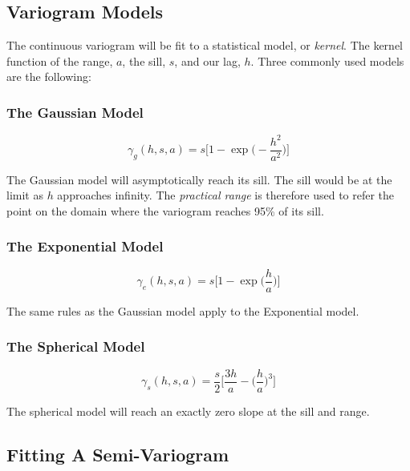 \documentclass[11pt]{ucthesis}
\begin{document}
\subsection{Variogram Models}
The continuous variogram will be fit to a statistical model, or \textit{kernel}. The kernel function of the range, $a$, the sill, $s$, and our lag, $h$. Three commonly used models are the following: %
\subsubsection{The Gaussian Model}

\begin{equation}
	\gamma_g(h, s, a) = s \Bigg[ 1 - \exp \Bigg( -\dfrac{h^2}{a^2} \Bigg) \Bigg]
	\label{eq:gauss_model}
\end{equation}

The Gaussian model will asymptotically reach its sill. The sill would be at the limit as $h$ approaches infinity. The \textit{practical range} is therefore used to refer the point on the domain where the variogram reaches 95\% of its sill.

\subsubsection{The Exponential Model}

\begin{equation}
	\gamma_e(h, s, a) = s \Bigg[ 1 - \exp \Bigg( \dfrac{h}{a} \Bigg) \Bigg]
	\label{eq:exp_model}
\end{equation}

The same rules as the Gaussian model apply to the Exponential model.

\subsubsection{The Spherical Model}

\begin{equation}
	\gamma_s(h, s, a) = \frac{s}{2} \Bigg[ \dfrac{3h}{a} - \Bigg( \dfrac{h}{a} \Bigg)^3 \Bigg]
	\label{eq:sph_model}
\end{equation}

The spherical model will reach an exactly zero slope at the sill and range.

\subsection{Fitting A Semi-Variogram} \label{sec:varfit}
\end{document}
